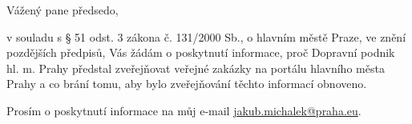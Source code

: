 \documentclass[11pt,a4paper,czech]{article}
\begin{document}

\def \yoursign { }
\def \yourdate { }
\def \oursign {ZK Pha 2/2014}
\def \place {Praha}

\printheader

\subject{Žádost zastupitele hl. m. Prahy o informace}

Vážený pane předsedo,

v souladu s § 51 odst. 3 zákona č. 131/2000 Sb., o hlavním městě Praze, ve znění pozdějších předpisů, Vás žádám o poskytnutí informace, proč Dopravní podnik hl. m. Prahy předstal zveřejňovat veřejné zakázky na portálu hlavního města Prahy a co brání tomu, aby bylo zveřejňování těchto informací obnoveno. 

Prosím o poskytnutí informace na můj e-mail \url{jakub.michalek@praha.eu}.

\signature{Mgr. Bc. Jakub Michálek \\ předseda klubu Pirátů \\ zastupitelstvo hl. m. Prahy}

\end{document}
